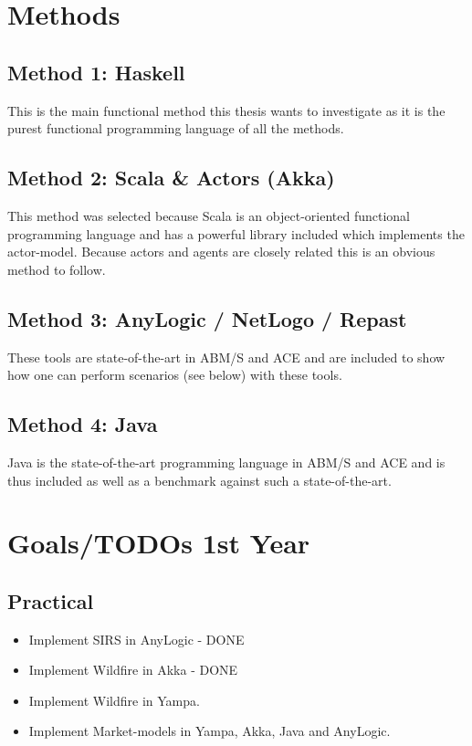 \documentclass{article}
\begin{document}

\section{Methods}
\subsection{Method 1: Haskell}
This is the main functional method this thesis wants to investigate as it is the purest functional programming language of all the methods.

\subsection{Method 2: Scala \& Actors (Akka)}
This method was selected because Scala is an object-oriented functional programming language and has a powerful library included which implements the actor-model. Because actors and agents are closely related this is an obvious method to follow.

\subsection{Method 3: AnyLogic / NetLogo / Repast}
These tools are state-of-the-art in ABM/S and ACE and are included to show how one can perform scenarios (see below) with these tools.

\subsection{Method 4: Java}
Java is the state-of-the-art programming language in ABM/S and ACE and is thus included as well as a benchmark against such a state-of-the-art.


\pagebreak

\section{Goals/TODOs 1st Year}
\subsection{Practical}
\begin{itemize}
\item Implement SIRS in AnyLogic - DONE
\item Implement Wildfire in Akka - DONE
\item Implement Wildfire in Yampa.
\item Implement Market-models in Yampa, Akka, Java and AnyLogic.
\end{itemize}
\end{document}
